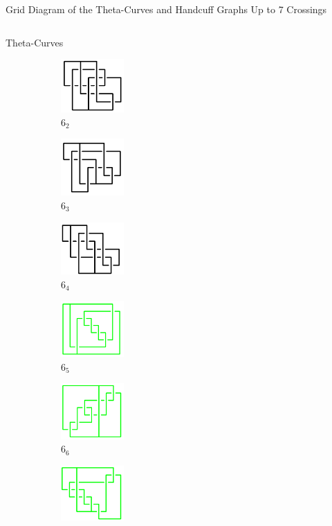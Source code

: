 \documentclass[final]{beamer}
\begin{document}
\begin{frame}[t]
\begin{alertblock}{Grid Diagram of the Theta-Curves and Handcuff Graphs Up to 7 Crossings}
\begin{columns}[t]
\begin{column}{0.6\textwidth}
\begin{alertblock}{Theta-Curves}
\begin{figure}
\begin{subfigure}{0.075\textwidth}
    \includegraphics[width=2.4cm]{../Midterm_Poster/grid_diagram/theta_6_2.png}
    \caption{$6_2$} 
    \end{subfigure}
    \begin{subfigure}{0.075\textwidth}
    \includegraphics[width=2.4cm]{../Midterm_Poster/grid_diagram/theta_6_3.png}
    \caption{$6_3$} 
    \end{subfigure}
    \begin{subfigure}{0.075\textwidth}
    \includegraphics[width=2.4cm]{../Midterm_Poster/grid_diagram/theta_6_4.png}
    \caption{$6_4$} 
    \end{subfigure}
    \begin{subfigure}{0.075\textwidth}
    \includegraphics[width=2.4cm]{../Midterm_Poster/grid_diagram/theta_6_5.png}
    \caption{$6_5$} 
    \end{subfigure}
    \begin{subfigure}{0.075\textwidth}
    \includegraphics[width=2.4cm]{../Midterm_Poster/grid_diagram/theta_6_6.png}
    \caption{$6_6$} 
    \end{subfigure}
    \begin{subfigure}{0.075\textwidth}
    \includegraphics[width=2.4cm]{../Midterm_Poster/grid_diagram/theta_6_7.png}

\end{subfigure}
\end{figure}
\end{alertblock}
\end{column}
\end{columns}
\end{alertblock}
\end{frame}
\end{document}
